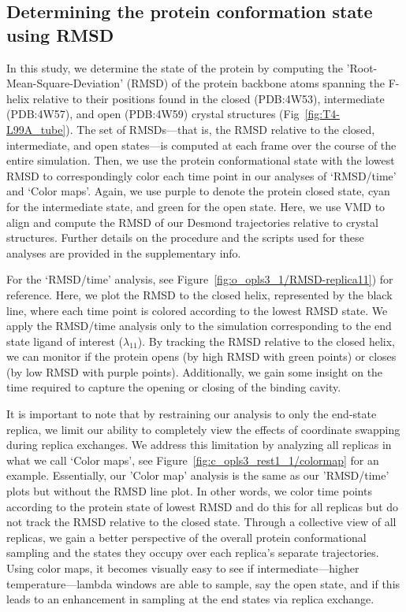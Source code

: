 \documentclass[journal=jctcce,manuscript=article]{achemso}
\begin{document}
\subsection*{Determining the protein conformation state using RMSD}
In this study, we determine the state of the protein by computing the 'Root-Mean-Square-Deviation' (RMSD) of the protein backbone atoms spanning the F-helix relative to their positions found in the closed (PDB:4W53), intermediate (PDB:4W57), and open (PDB:4W59) crystal structures (Fig~\ref{fig:T4-L99A_tube}).
The set of RMSDs---that is, the RMSD relative to the closed, intermediate, and open states---is computed at each frame over the course of the entire simulation. 
Then, we use the protein conformational state with the lowest RMSD to correspondingly color each time point in our analyses of `RMSD/time' and `Color maps'.
Again, we use purple to denote the protein closed state, cyan for the intermediate state, and green for the open state.
Here, we use VMD \cite{VMDpaper,VMDalignment} to align and compute the RMSD of our Desmond trajectories relative to crystal structures.
Further details on the procedure and the scripts used for these analyses are provided in the supplementary info.

For the `RMSD/time' analysis, see Figure~\ref{fig:o_opls3_1/RMSD-replica11}) for reference. 
Here, we plot the RMSD to the closed helix, represented by the black line, where each time point is colored according to the lowest RMSD state.
We apply the RMSD/time analysis only to the simulation corresponding to the end state ligand of interest ($\lambda_{11}$).
By tracking the RMSD relative to the closed helix, we can monitor if the protein opens (by high RMSD with green points) or closes (by low RMSD with purple points).
Additionally, we gain some insight on the time required to capture the opening or closing of the binding cavity.

It is important to note that by restraining our analysis to only the end-state replica, we limit our ability to completely view the effects of coordinate swapping during replica exchanges.
We address this limitation by analyzing all replicas in what we call `Color maps', see Figure~\ref{fig:c_opls3_rest1_1/colormap} for an example.
Essentially, our 'Color map' analysis is the same as our 'RMSD/time' plots but without the RMSD line plot.
In other words, we color time points according to the protein state of lowest RMSD and do this for all replicas but do not track the RMSD relative to the closed state.
Through a collective view of all replicas, we gain a better perspective of the overall protein conformational sampling and the states they occupy over each replica's separate trajectories. 
Using color maps, it becomes visually easy to see if intermediate---higher temperature---lambda windows are able to sample, say the open state, and if this leads to an enhancement in sampling at the end states via replica exchange.
\end{document}
